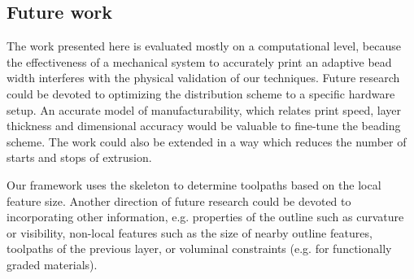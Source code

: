\subsection{Future work}
The work presented here is evaluated mostly on a computational level, because the effectiveness of a mechanical system to accurately print an adaptive bead width interferes with the physical validation of our techniques.
Future research could be devoted to optimizing the distribution scheme to a specific hardware setup.
An accurate model of manufacturability, {which relates }print speed, {layer thickness }and dimensional accuracy would be valuable to fine-tune the beading scheme.
{The work could also be extended in a way which reduces the number of starts and stops of extrusion.}

Our framework uses the skeleton to determine toolpaths based on the local feature size.
Another direction of future research could be devoted to incorporating other information, e.g. properties of the outline such as curvature or visibility, non-local features such as the size of nearby outline features, toolpaths of the previous layer, or voluminal constraints (e.g. for functionally graded materials).

